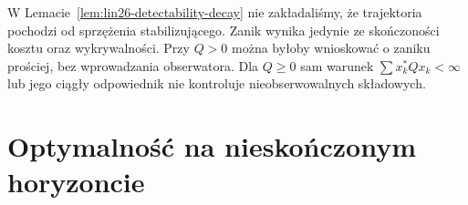 \begin{uwaga}
\label{rem:lin26-decay-role}
W Lemacie~\ref{lem:lin26-detectability-decay}
nie zakładaliśmy,
że trajektoria pochodzi
od sprzężenia stabilizującego.
Zanik wynika jedynie
ze skończoności kosztu
oraz wykrywalności.
Przy \(Q>0\)
można byłoby wnioskować
o zaniku prościej,
bez wprowadzania obserwatora.
Dla \(Q\ge0\)
sam warunek
\(\sum x_k^*Qx_k<\infty\)
lub jego ciągły odpowiednik
nie kontroluje
nieobserwowalnych składowych.
\end{uwaga}

\section{Optymalność na nieskończonym horyzoncie}
\label{sec:lin26-infinite}


